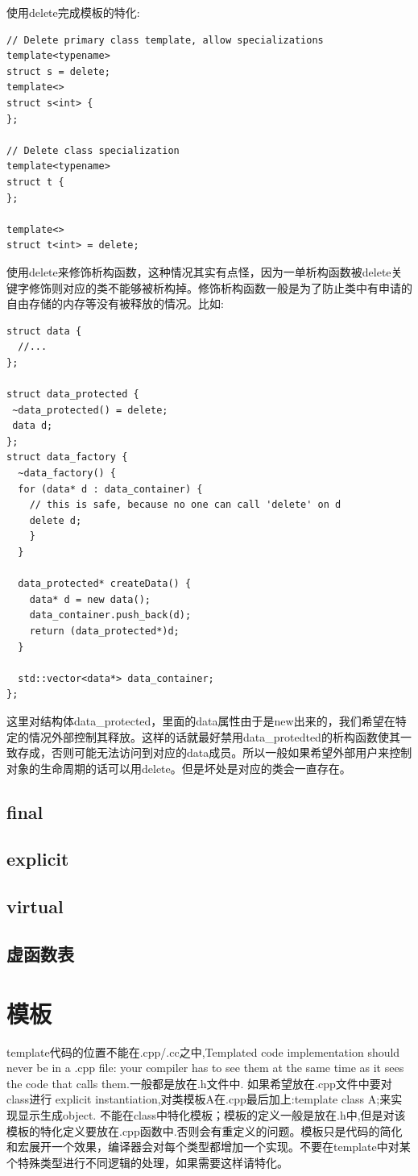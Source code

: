 \documentclass[12pt]{book}
\begin{document}
使用delete完成模板的特化:
\begin{lstlisting}
// Delete primary class template, allow specializations
template<typename>
struct s = delete;
template<>
struct s<int> {
};

// Delete class specialization
template<typename>
struct t {
};

template<>
struct t<int> = delete;
\end{lstlisting}

使用delete来修饰析构函数，这种情况其实有点怪，因为一单析构函数被delete关键字修饰则对应的类不能够被析构掉。修饰析构函数一般是为了防止类中有申请的自由存储的内存等没有被释放的情况。比如:
\begin{lstlisting}
struct data {
  //...
};
	
struct data_protected {
 ~data_protected() = delete;
 data d;
};
struct data_factory {		
  ~data_factory() {
  for (data* d : data_container) {
	// this is safe, because no one can call 'delete' on d
	delete d;
	}
  }
		
  data_protected* createData() {
	data* d = new data();
	data_container.push_back(d);
	return (data_protected*)d;
  }

  std::vector<data*> data_container;
};
\end{lstlisting}

这里对结构体data\_protected，里面的data属性由于是new出来的，我们希望在特定的情况外部控制其释放。这样的话就最好禁用data\_protedted的析构函数使其一致存成，否则可能无法访问到对应的data成员。所以一般如果希望外部用户来控制对象的生命周期的话可以用delete。但是坏处是对应的类会一直存在。

\subsection{final}
\subsection{explicit}

\subsection{virtual}
\subsection{虚函数表}
\section{模板}
template代码的位置不能在.cpp/.cc之中,Templated code implementation should never be in a .cpp file: your compiler has to see them at the same time as it sees the code that calls them.一般都是放在.h文件中. 如果希望放在.cpp文件中要对class进行 explicit instantiation,对类模板A在.cpp最后加上:template class A;来实现显示生成object. 不能在class中特化模板；模板的定义一般是放在.h中,但是对该模板的特化定义要放在.cpp函数中.否则会有重定义的问题。模板只是代码的简化和宏展开一个效果，编译器会对每个类型都增加一个实现。不要在template中对某个特殊类型进行不同逻辑的处理，如果需要这样请特化。
\end{document}
